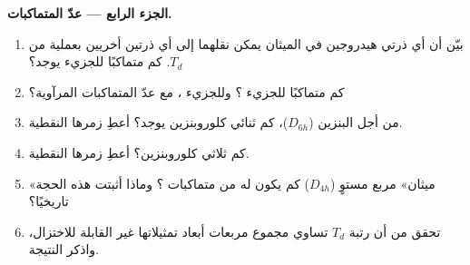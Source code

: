 \begin{problem}
\medskip\noindent\textbf{الجزء الرابع --- عدّ المتماكبات.}
\begin{enumerate}[resume]
  \item بيّن أن أي ذرتي هيدروجين في الميثان يمكن نقلهما إلى أي ذرتين
        أخريين بعملية من $T_d$. كم متماكبًا للجزيء  يوجد؟
  \item كم متماكبًا للجزيء ؟ وللجزيء ، مع عدّ المتماكبات المرآوية؟
  \item من أجل البنزين ($D_{6h}$)، كم ثنائي كلوروبنزين يوجد؟ أعطِ
        زمرها النقطية.
  \item كم ثلاثي كلوروبنزين؟ أعطِ زمرها النقطية.
  \item «ميثان» مربع مستوٍ ($D_{4h}$) كم يكون له من متماكبات
        ؟ وماذا أثبتت هذه الحجة تاريخيًا؟
  \item تحقق من أن رتبة $T_d$ تساوي مجموع مربعات أبعاد
        تمثيلاتها غير القابلة للاختزال، واذكر النتيجة.
\end{enumerate}
\end{problem}
